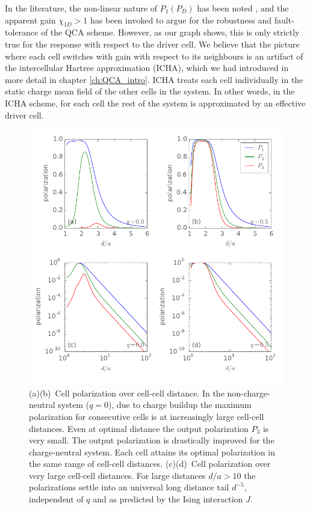 In the literature, the non-linear nature of $P_1(P_D)$ has been noted
\cite{lent1993quantum} \cite{lent1993lines}, and the apparent gain $\chi_{1D} >
1$ has been invoked to argue for the robustness and fault-tolerance of the QCA
scheme. However, as our graph shows, this is only strictly true for the response
with respect to the driver cell. We believe that the picture where each cell
switches with gain with respect to its neighbours is an artifact of the
intercellular Hartree approximation (ICHA), which we had introduced in more
detail in chapter \ref{ch:QCA_intro}. ICHA treats each cell individually in the
static charge mean field of the other cells in the system. In other words, in
the ICHA scheme, for each cell the rest of the system is approximated by an
effective driver cell.

%
\begin{figure}
  \center
  \includegraphics{three_cells_P_over_d}
  \caption{
  (a)(b)~Cell polarization over cell-cell distance. In the non-charge-neutral
  system ($q = 0$), due to charge buildup the maximum polarization for
  consecutive cells is at increasingly large cell-cell distances. Even at
  optimal distance the output polarization $P_3$ is very small. The output
  polarization is drastically improved for the charge-neutral system. Each cell
  attains its optimal polarization in the same range of cell-cell distances.
  (c)(d)~Cell polarization over very large cell-cell distances. For large
  distances $d/a > 10$ the polarizations settle into an universal long distance
  tail $d^{-5}$, independent of $q$ and as predicted by the Ising interaction
  $J$.
  }
  \label{fig:three_cells_P_over_d}
\end{figure}
